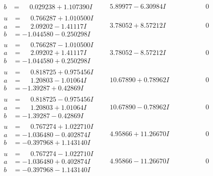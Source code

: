 \documentclass[1p]{elsarticle_modified}
\theoremstyle{definition}
\begin{document}
$$\begin{array}{c|c|c}
\begin{aligned}
b &= \phantom{-}0.029238 + 1.107390 I\end{aligned}
 & \phantom{-}5.89977 - 6.30984 I & \phantom{-0.000000 } 0 \\ \hline\begin{aligned}
u &= \phantom{-}0.766287 + 1.010500 I \\
a &= \phantom{-}2.09202 - 1.41117 I \\
b &= -1.044580 - 0.250298 I\end{aligned}
 & \phantom{-}3.78052 + 8.57212 I & \phantom{-0.000000 } 0 \\ \hline\begin{aligned}
u &= \phantom{-}0.766287 - 1.010500 I \\
a &= \phantom{-}2.09202 + 1.41117 I \\
b &= -1.044580 + 0.250298 I\end{aligned}
 & \phantom{-}3.78052 - 8.57212 I & \phantom{-0.000000 } 0 \\ \hline\begin{aligned}
u &= \phantom{-}0.818725 + 0.975456 I \\
a &= \phantom{-}1.20803 - 1.01064 I \\
b &= -1.39287 + 0.42869 I\end{aligned}
 & \phantom{-}10.67890 + 0.78962 I & \phantom{-0.000000 } 0 \\ \hline\begin{aligned}
u &= \phantom{-}0.818725 - 0.975456 I \\
a &= \phantom{-}1.20803 + 1.01064 I \\
b &= -1.39287 - 0.42869 I\end{aligned}
 & \phantom{-}10.67890 - 0.78962 I & \phantom{-0.000000 } 0 \\ \hline\begin{aligned}
u &= \phantom{-}0.767274 + 1.022710 I \\
a &= -1.036480 - 0.402874 I \\
b &= -0.397968 + 1.143140 I\end{aligned}
 & \phantom{-}4.95866 + 11.26670 I & \phantom{-0.000000 } 0 \\ \hline\begin{aligned}
u &= \phantom{-}0.767274 - 1.022710 I \\
a &= -1.036480 + 0.402874 I \\
b &= -0.397968 - 1.143140 I\end{aligned}
 & \phantom{-}4.95866 - 11.26670 I & \phantom{-0.000000 } 0\\

\end{array}$$
\end{document}
